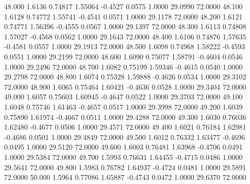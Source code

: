   48.000   1.6136   0.74817   1.55064  -0.4527   0.0575   1.0000  29.0990  72.0000
  48.100   1.6128   0.74772   1.55741  -0.4541   0.0571   1.0000  29.1178  72.0000
  48.200   1.6121   0.74771   1.56396  -0.4555   0.0567   1.0000  29.1397  72.0000
  48.300   1.6113   0.74808   1.57027  -0.4568   0.0562   1.0000  29.1643  72.0000
  48.400   1.6106   0.74876   1.57635  -0.4581   0.0557   1.0000  29.1913  72.0000
  48.500   1.6098   0.74968   1.58222  -0.4593   0.0551   1.0000  29.2199  72.0000
  48.600   1.6090   0.75077   1.58791  -0.4604   0.0546   1.0000  29.2496  72.0000
  48.700   1.6082   0.75199   1.59346  -0.4615   0.0540   1.0000  29.2798  72.0000
  48.800   1.6074   0.75328   1.59888  -0.4626   0.0534   1.0000  29.3102  72.0000
  48.900   1.6065   0.75464   1.60421  -0.4636   0.0528   1.0000  29.3404  72.0000
  49.000   1.6057   0.75603   1.60945  -0.4647   0.0522   1.0000  29.3703  72.0000
  49.100   1.6048   0.75746   1.61463  -0.4657   0.0517   1.0000  29.3998  72.0000
  49.200   1.6039   0.75890   1.61974  -0.4667   0.0511   1.0000  29.4288  72.0000
  49.300   1.6030   0.76036   1.62480  -0.4677   0.0506   1.0000  29.4571  72.0000
  49.400   1.6021   0.76184   1.62981  -0.4686   0.0501   1.0000  29.4849  72.0000
  49.500   1.6012   0.76332   1.63477  -0.4696   0.0495   1.0000  29.5120  72.0000
  49.600   1.6003   0.76481   1.63968  -0.4706   0.0491   1.0000  29.5384  72.0000
  49.700   1.5993   0.76631   1.64455  -0.4715   0.0486   1.0000  29.5641  72.0000
  49.800   1.5983   0.76782   1.64937  -0.4724   0.0481   1.0000  29.5891  72.0000
  50.000   1.5964   0.77086   1.65887  -0.4743   0.0472   1.0000  29.6370  72.0000
